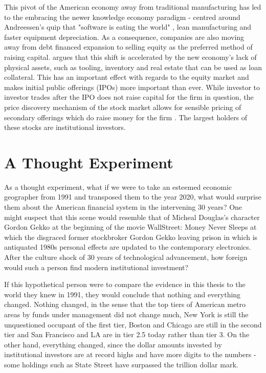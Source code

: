 This pivot of the American economy away from traditional manufacturing has led to the embracing the newer knowledge economy paradigm - centred around Andreessen's quip that "software is eating the world" \cite{Andressen2011}, lean manufacturing and faster equipment depreciation.  As a consequence, companies are also moving away from debt financed expansion to selling equity as the preferred method of raising capital. 	\cite{Graves2003} argues that this shift is accelerated by the new economy's lack of physical assets, such as tooling, inventory and real estate that can be used as loan collateral. This has an important effect with regards to the equity market and makes initial public offerings (IPOs) more important than ever. While investor to investor trades after the IPO does not raise capital for the firm in question, the price discovery mechanism of the stock market allows for sensible pricing of secondary offerings which do raise money for the firm \citep{Tobin1969}. The largest holders of these stocks are institutional investors.  

\section{A Thought Experiment}

As a thought experiment, what if we were to take an esteemed economic geographer from 1991 and transposed them to the year 2020, what would surprise them about the American financial system in the intervening 30 years?  One might suspect that this scene would resemble that of Micheal Douglas's character Gordon Gekko at the beginning of the movie WallStreet: Money Never Sleeps at which the disgraced former stockbroker Gordon Gekko leaving prison in which is antiquated 1980s personal effects are updated to the contemporary electronics.  After the culture shock of 30 years of technological advancement, how foreign would such a person find modern institutional investment?  

If this hypothetical person were to compare the evidence in this thesis to the world they knew in 1991, they would conclude that nothing and everything changed.  Nothing changed, in the sense that the top tiers of American metro areas by funds under management did not change much, New York is still the unquestioned occupant of the first tier, Boston and Chicago are still in the second tier and San Francisco and LA are in tier 2.5 today rather than tier 3.  On the other hand, everything changed, since the dollar amounts invested by institutional investors are at record highs and have more digits to the numbers - some holdings such as State Street have surpassed the trillion dollar mark.  

